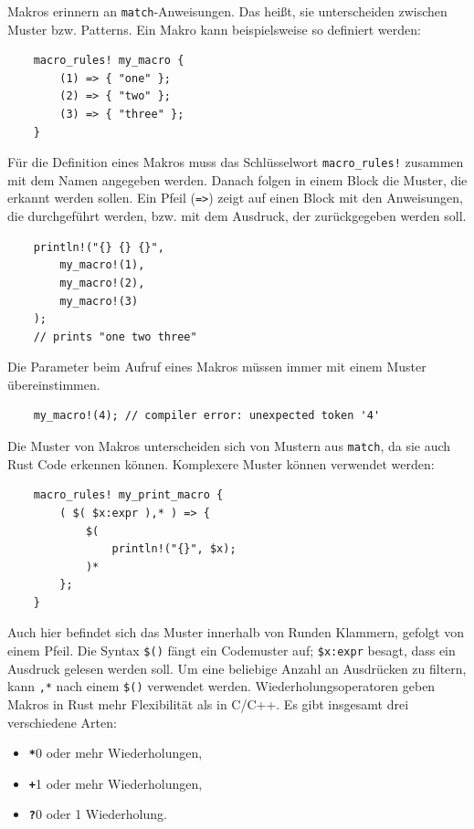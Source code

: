 Makros erinnern an \verb"match"-Anweisungen. Das heißt, sie unterscheiden zwischen Muster bzw. Patterns. Ein Makro kann beispielsweise so definiert werden:

\begin{lstlisting}
    macro_rules! my_macro {
        (1) => { "one" };
        (2) => { "two" };
        (3) => { "three" };
    }
\end{lstlisting}

Für die Definition eines Makros muss das Schlüsselwort \verb"macro_rules!" zusammen mit dem Namen angegeben werden. Danach folgen in einem Block die Muster, die erkannt werden sollen. Ein Pfeil (\verb"=>") zeigt auf einen Block mit den Anweisungen, die durchgeführt werden, bzw. mit dem Ausdruck, der zurückgegeben werden soll.

\begin{lstlisting}
    println!("{} {} {}",
        my_macro!(1),
        my_macro!(2),
        my_macro!(3)
    );
    // prints "one two three"
\end{lstlisting}

Die Parameter beim Aufruf eines Makros müssen immer mit einem Muster übereinstimmen.

\begin{lstlisting}
    my_macro!(4); // compiler error: unexpected token '4'
\end{lstlisting}

Die Muster von Makros unterscheiden sich von Mustern aus \verb"match", da sie auch Rust Code erkennen können. Komplexere Muster können verwendet werden:

\begin{lstlisting}
    macro_rules! my_print_macro {
        ( $( $x:expr ),* ) => {
            $(
                println!("{}", $x);
            )*
        };
    }
\end{lstlisting}

Auch hier befindet sich das Muster innerhalb von Runden Klammern, gefolgt von einem Pfeil. Die Syntax \verb"$()" fängt ein Codemuster auf; \verb"$x:expr" besagt, dass ein Ausdruck gelesen werden soll. Um eine beliebige Anzahl an Ausdrücken zu filtern, kann \verb",*" nach einem \verb"$()" verwendet werden. Wiederholungsoperatoren geben Makros in Rust mehr Flexibilität als in C/C++. Es gibt insgesamt drei verschiedene Arten:

\begin{itemize}
    \item \textbf{\texttt{*}}\hspace{10pt}0 oder mehr Wiederholungen,
    \item \textbf{\texttt{+}}\hspace{10pt}1 oder mehr Wiederholungen,
    \item \textbf{\texttt{?}}\hspace{10pt}0 oder 1 Wiederholung.
\end{itemize}

